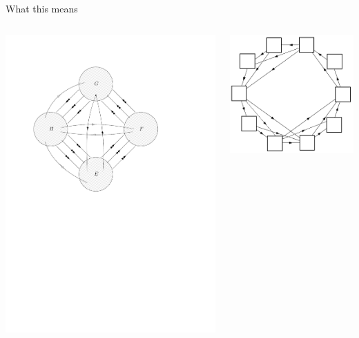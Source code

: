 \documentclass{beamer}
\begin{document}
\begin{frame}{What this means}
	\begin{columns}
        \centering
        \includegraphics[scale=0.3]{Images/4blobs.pdf}

        \centering
        \includegraphics[scale=0.3]{Images/decomposition_round.png}
    \end{columns}
\end{frame}
\end{document}
